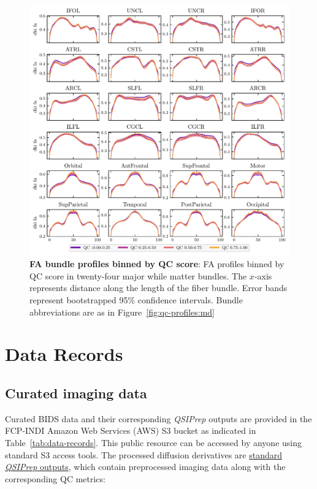 \documentclass[fleqn,10pt,inline]{wlscirep}
\begin{document}
\begin{figure}[tbp]
    \centering
    \includegraphics[width=\linewidth]{qc-bins-dki-fa.pdf}
    \caption[FA bundle profiles]{%
        {\bf FA bundle profiles binned by QC score}:
        FA profiles binned by QC score in twenty-four major while matter
        bundles. The $x$-axis represents distance along the length of the fiber
        bundle. Error bands represent bootstrapped 95\% confidence intervals.
        Bundle abbreviations are as in Figure~\ref{fig:qc-profiles:md}
    }
    \label{fig:qc-profiles:fa}
\end{figure}

\section*{Data Records}

\subsection*{Curated imaging data}

Curated BIDS data and their corresponding \emph{QSIPrep} outputs are provided in the FCP-INDI Amazon Web Services (AWS) S3 bucket  as indicated in Table~\ref{tab:data-records}.
This public resource can be accessed by anyone using standard S3 access tools.
The processed diffusion derivatives are \href{
https://qsiprep.readthedocs.io/en/latest/preprocessing.html#outputs-of-qsiprep}{
standard \emph{QSIPrep} outputs}, which contain preprocessed imaging data
along with the corresponding QC metrics:
\end{document}
